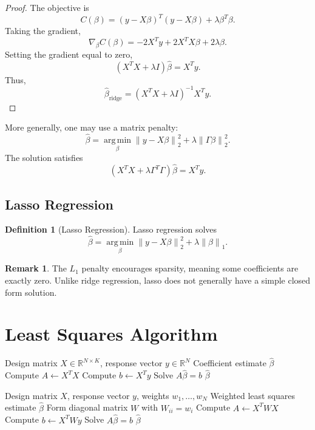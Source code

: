 \documentclass[12pt,oneside]{book}
\numberwithin{equation}{section}
\theoremstyle{definition}
\newtheorem{definition}{Definition}[section]
\newtheorem{remark}{Remark}[section]
\theoremstyle{plain}
\theoremstyle{remark}
\newcommand{\R}{\mathbb{R}}
\newcommand{\argmin}{\operatorname*{arg\,min}}
\newcommand{\norm}[1]{\left\lVert #1 \right\rVert}
\newcommand{\grad}{\nabla}
\begin{document}
\begin{proof}
The objective is
\[
C(\beta)
=
(y-X\beta)^T(y-X\beta)+\lambda\beta^T\beta.
\]
Taking the gradient,
\[
\grad_\beta C(\beta)
=
-2X^Ty+2X^TX\beta+2\lambda\beta.
\]
Setting the gradient equal to zero,
\[
(X^TX+\lambda I)\hat{\beta}=X^Ty.
\]
Thus,
\[
\hat{\beta}_{\mathrm{ridge}}
=
(X^TX+\lambda I)^{-1}X^Ty.
\]
\end{proof}

More generally, one may use a matrix penalty:
\[
\hat{\beta}
=
\argmin_{\beta}
\norm{y-X\beta}_2^2
+
\lambda\norm{\Gamma\beta}_2^2.
\]
The solution satisfies
\[
(X^TX+\lambda\Gamma^T\Gamma)\hat{\beta}=X^Ty.
\]

\subsection{Lasso Regression}

\begin{definition}[Lasso Regression]
Lasso regression solves
\[
\hat{\beta}
=
\argmin_{\beta}
\norm{y-X\beta}_2^2
+
\lambda\norm{\beta}_1.
\]
\end{definition}

\begin{remark}
The $L_1$ penalty encourages sparsity, meaning some coefficients are exactly zero. Unlike ridge regression, lasso does not generally have a simple closed form solution.
\end{remark}

\section{Least Squares Algorithm}

\begin{algorithm}[H]
\caption{Ordinary Least Squares via Normal Equations}
\begin{algorithmic}[1]
\Require Design matrix $X \in \R^{N\times K}$, response vector $y \in \R^N$
\Ensure Coefficient estimate $\hat{\beta}$
\State Compute $A \gets X^TX$
\State Compute $b \gets X^Ty$
\State Solve $A\hat{\beta}=b$
\State \Return $\hat{\beta}$
\end{algorithmic}
\end{algorithm}

\begin{algorithm}[H]
\caption{Weighted Least Squares}
\begin{algorithmic}[1]
\Require Design matrix $X$, response vector $y$, weights $w_1,\dots,w_N$
\Ensure Weighted least squares estimate $\hat{\beta}$
\State Form diagonal matrix $W$ with $W_{ii}=w_i$
\State Compute $A \gets X^TWX$
\State Compute $b \gets X^TWy$
\State Solve $A\hat{\beta}=b$
\State \Return $\hat{\beta}$
\end{algorithmic}
\end{algorithm}
\end{document}
